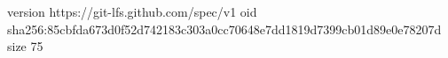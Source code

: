 version https://git-lfs.github.com/spec/v1
oid sha256:85cbfda673d0f52d742183c303a0cc70648e7dd1819d7399cb01d89e0e78207d
size 75
